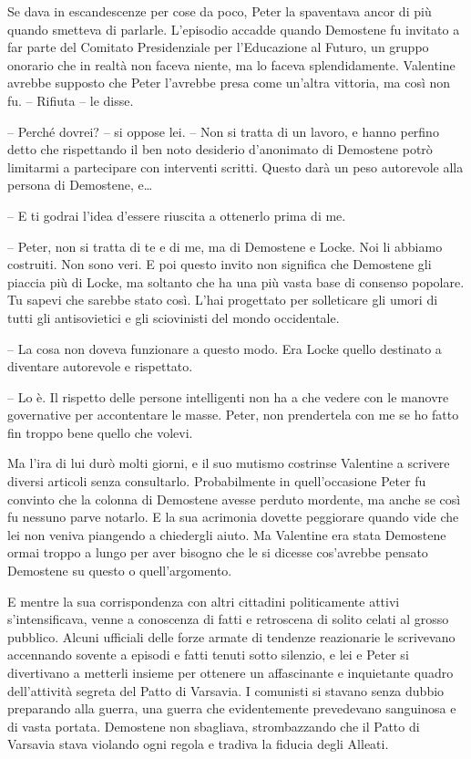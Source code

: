 {Se dava in escandescenze per cose da poco, Peter la spaventava ancor di
	più quando smetteva di parlarle. L'episodio accadde quando Demostene fu
	invitato a far parte del Comitato Presidenziale per l'Educazione al
	Futuro, un gruppo onorario che in realtà non faceva niente, ma lo faceva
	splendidamente. Valentine avrebbe supposto che Peter l'avrebbe presa
	come un'altra vittoria, ma così non fu. -- Rifiuta -- le disse.}

{-- Perché dovrei? -- si oppose lei. -- Non si tratta di un lavoro, e
	hanno perfino detto che rispettando il ben noto desiderio d'anonimato di
	Demostene potrò limitarmi a partecipare con interventi scritti. Questo
	darà un peso autorevole alla persona di Demostene, e\ldots{}}

{-- E ti godrai l'idea d'essere riuscita a ottenerlo prima di me.}

{-- Peter, non si tratta di te e di me, ma di Demostene e Locke. Noi li
	abbiamo costruiti. Non sono veri. E poi questo invito non significa che
	Demostene gli piaccia più di Locke, ma soltanto che ha una più vasta
	base di consenso popolare. Tu sapevi che sarebbe stato così. L'hai
	progettato per solleticare gli umori di tutti gli antisovietici e gli
	sciovinisti del mondo occidentale.}

{-- La cosa non doveva funzionare a questo modo. Era Locke quello
	destinato a diventare autorevole e rispettato.}

{-- Lo è. Il rispetto delle persone intelligenti non ha a che vedere con
	le manovre governative per accontentare le masse. Peter, non prendertela
	con me se ho fatto fin troppo bene quello che volevi.}

{Ma l'ira di lui durò molti giorni, e il suo mutismo costrinse Valentine
	a scrivere diversi articoli senza consultarlo. Probabilmente in
	quell'occasione Peter fu convinto che la colonna di Demostene avesse
	perduto mordente, ma anche se così fu nessuno parve notarlo. E la sua
	acrimonia dovette peggiorare quando vide che lei non veniva piangendo a
	chiedergli aiuto. Ma Valentine era stata Demostene ormai troppo a lungo
	per aver bisogno che le si dicesse cos'avrebbe pensato Demostene su
	questo o quell'argomento.}

{E mentre la sua corrispondenza con altri cittadini politicamente attivi
	s'intensificava, venne a conoscenza di fatti e retroscena di solito
	celati al grosso pubblico. Alcuni ufficiali delle forze armate di
	tendenze reazionarie le scrivevano accennando sovente a episodi e fatti
	tenuti sotto silenzio, e lei e Peter si divertivano a metterli insieme
	per ottenere un affascinante e inquietante quadro dell'attività segreta
	del Patto di Varsavia. I comunisti si stavano senza dubbio preparando
	alla guerra, una guerra che evidentemente prevedevano sanguinosa e di
	vasta portata. Demostene non sbagliava, strombazzando che il Patto di
	Varsavia stava violando ogni regola e tradiva la fiducia degli Alleati.}

